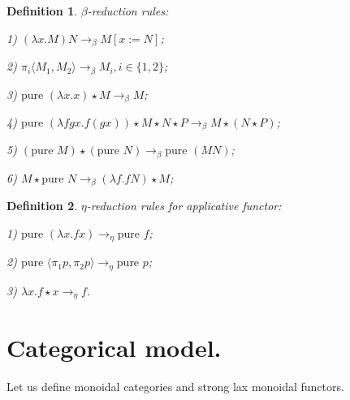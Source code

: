 \documentclass[a4paper]{article}
\newtheorem{defin}{Definition}
\begin{document}
\begin{defin} $\beta$-reduction rules:

1) $(\lambda x. M) N \rightarrow_{\beta} M [x := N]$;

2) $\pi_i \langle M_1, M_2 \rangle \rightarrow_{\beta} M_i, i \in \{ 1,2 \}$;

3) $\text{pure } (\lambda x. x) \star M \rightarrow_{\beta} M$;

4) $\text{pure } (\lambda f g x. f (g x)) \star M \star N \star P \rightarrow_{\beta} M \star (N \star P)$;

5) $(\text{pure } M) \star (\text{pure } N) \rightarrow_{\beta} \text{pure } (M N)$;

6) $M \star \text{pure } N \rightarrow_{\beta} (\lambda f. f N) \star M$;
\end{defin}

\begin{defin} $\eta$-reduction rules for applicative functor:

1) $\text{pure } (\lambda x. f x) \rightarrow_{\eta} \text{pure } f$;

2) $\text{pure } \langle \pi_1 p, \pi_2 p \rangle \rightarrow_{\eta} \text{pure } p$;

3) $\lambda x. f \star x \rightarrow_{\eta} f$.
\end{defin}


\section{Categorical model.}
Let us define monoidal categories and strong lax monoidal functors.
\end{document}
